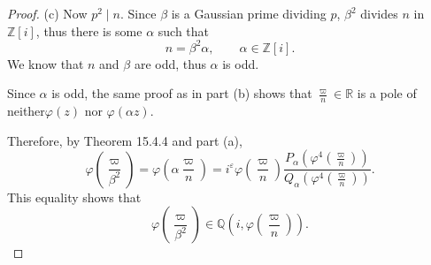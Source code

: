 \documentclass[11pt,a4paper]{article}
\newcommand{\Q}{\mathbb{Q}}
\newcommand{\Z}{\mathbb{Z}}
\newcommand{\R}{\mathbb{R}}
\begin{document}
\begin{proof}
\item[(c)] Now $p^2 \mid n$.  Since $\beta$ is a Gaussian prime dividing $p$, $\beta^2$ divides $n$ in $\Z[i]$, thus there is some $\alpha$ such that
$$n = \beta^2 \alpha,\qquad \alpha \in \Z[i].$$
We know that $n$ and $\beta$ are odd, thus $\alpha$ is odd.

Since $\alpha$ is odd, the same proof as in part (b) shows that  $ \frac{\varpi}{n} \in \R$ is a pole of neither$\varphi(z)$ nor $\varphi(\alpha z)$.

Therefore, by Theorem 15.4.4 and part (a),
$$\varphi\left(\frac{\varpi}{\beta^2} \right) = \varphi\left(\alpha \frac {\varpi}{n} \right) = i^\varepsilon \varphi\left(\frac{\varpi}{n}\right) \frac{P_\alpha\left(\varphi^4\left(\frac{\varpi}{n}\right)\right)}{Q_\alpha\left(\varphi^4\left(\frac{\varpi}{n}\right)\right)}.
$$
This equality shows that
$$\varphi\left(\frac{\varpi}{\beta^2} \right) \in \Q\left(i, \varphi\left(\frac{\varpi}{n}\right)\right).$$
\end{proof}
\end{document}
